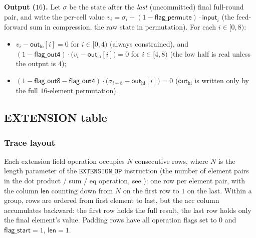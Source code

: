 \documentclass{article}
\theoremstyle{definition}
\begin{document}
\textbf{Output ($16$).} Let $\sigma$ be the state after the \emph{last} (uncommitted) final full-round pair, and write the per-cell value $v_i = \sigma_i + (1 - \textsf{flag\_permute}) \cdot \textsf{input}_i$ (the feed-forward sum in compression, the raw state in permutation). For each $i \in [0, 8)$:
\begin{itemize}
    \item $v_i - \textsf{out}_\text{lo}[i] = 0$ \quad for $i \in [0, 4)$ (always constrained), and $(1 - \textsf{flag\_out4}) \cdot \big(v_i - \textsf{out}_\text{lo}[i]\big) = 0$ \quad for $i \in [4, 8)$ (the low half is real unless the output is $4$);
    \item $(1 - \textsf{flag\_out8} - \textsf{flag\_out4}) \cdot \big(\sigma_{i+8} - \textsf{out}_\text{hi}[i]\big) = 0$ \quad ($\textsf{out}_\text{hi}$ is written only by the full $16$-element permutation).
\end{itemize}


\subsection{EXTENSION table}\label{sec:extension-table}

\subsubsection{Trace layout}

Each extension field operation occupies $N$ consecutive rows, where $N$ is the length parameter of the $\texttt{EXTENSION\_OP}$ instruction (the number of element pairs in the dot product / sum / eq operation, see ): one row per element pair, with the column $\textsf{len}$ counting down from $N$ on the first row to $1$ on the last. Within a group, rows are ordered from first element to last, but the \textsf{acc} column accumulates backward: the first row holds the full result, the last row holds only the final element's value. Padding rows have all operation flags set to 0 and $\textsf{flag\_start} = 1$, $\textsf{len} = 1$.

\vspace{3mm}
\end{document}
